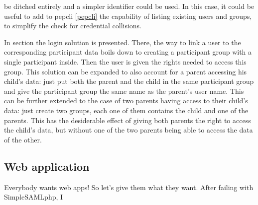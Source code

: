 \documentclass{report}
\begin{document}
be ditched entirely and a simpler identifier could be used. In this case, it could be useful to add to pepcli \ref{pepcli} the capability of listing existing users and groups, to
simplify the check for credential collisions. \par
In section  the login solution is presented. There, the way to link a user to the corresponding participant data boils down to creating a participant group with a
single participant inside. Then the user is given the rights needed to access this group. This solution can be expanded to also account for a parent accessing his child's data:
just put both the parent and the child in the same participant group and give the participant group the same name as the parent's user name. This can be further extended to the
case of two parents having access to their child's data: just create two groups, each one of them contains the child and one of the parents. This has the desiderable effect of
giving both parents the right to access the child's data, but without one of the two parents being able to access the data of the other.



\iffalse

\subsection{Web application}
Everybody wants web apps! So let's give them what they want. After failing with SimpleSAMLphp, I 
\end{document}
